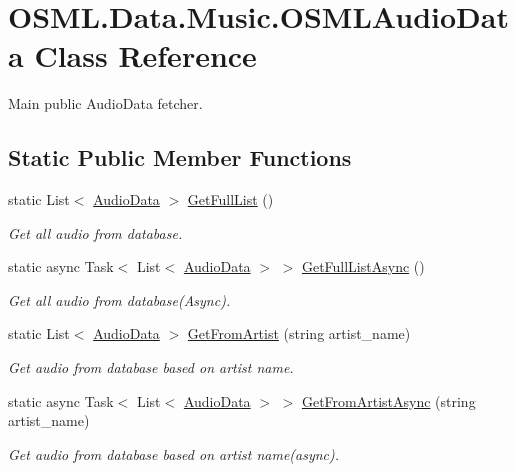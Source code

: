 \hypertarget{classOSML_1_1Data_1_1Music_1_1OSMLAudioData}{}\section{O\+S\+M\+L.\+Data.\+Music.\+O\+S\+M\+L\+Audio\+Data Class Reference}
\label{classOSML_1_1Data_1_1Music_1_1OSMLAudioData}


Main public Audio\+Data fetcher.  


\subsection*{Static Public Member Functions}
\begin{DoxyCompactItemize}
\item 
static List$<$ \mbox{\hyperlink{classOSML_1_1Media_1_1AudioData}{Audio\+Data}} $>$ \mbox{\hyperlink{classOSML_1_1Data_1_1Music_1_1OSMLAudioData_a34edf0c6c48e34a22ee634a35e280c74}{Get\+Full\+List}} ()
\begin{DoxyCompactList}\small\item\em Get all audio from database. \end{DoxyCompactList}\item 
static async Task$<$ List$<$ \mbox{\hyperlink{classOSML_1_1Media_1_1AudioData}{Audio\+Data}} $>$ $>$ \mbox{\hyperlink{classOSML_1_1Data_1_1Music_1_1OSMLAudioData_a54e9d005b15fbbdc98669b667f11ad44}{Get\+Full\+List\+Async}} ()
\begin{DoxyCompactList}\small\item\em Get all audio from database(\+Async). \end{DoxyCompactList}\item 
static List$<$ \mbox{\hyperlink{classOSML_1_1Media_1_1AudioData}{Audio\+Data}} $>$ \mbox{\hyperlink{classOSML_1_1Data_1_1Music_1_1OSMLAudioData_a44522dff16b681e2649f37e135dc1de1}{Get\+From\+Artist}} (string artist\+\_\+name)
\begin{DoxyCompactList}\small\item\em Get audio from database based on artist name. \end{DoxyCompactList}\item 
static async Task$<$ List$<$ \mbox{\hyperlink{classOSML_1_1Media_1_1AudioData}{Audio\+Data}} $>$ $>$ \mbox{\hyperlink{classOSML_1_1Data_1_1Music_1_1OSMLAudioData_ad4f7e4ba9f63728ebc6203ebbc191022}{Get\+From\+Artist\+Async}} (string artist\+\_\+name)
\begin{DoxyCompactList}\small\item\em Get audio from database based on artist name(async). \end{DoxyCompactList}\item 

\end{DoxyCompactItemize}
